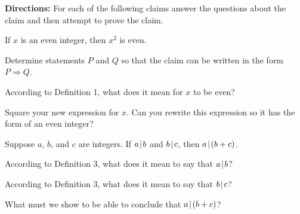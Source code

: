\newpage

\noindent \textbf{Directions:}  For each of the following claims answer the questions about the claim and then attempt to prove the claim.

\begin{claim}  If $x$ is an even integer, then $x^2$ is even.
\end{claim}
\begin{mdframed}[backgroundcolor=white]
	\begin{question}
	\item  Determine statements $P$ and $Q$ so that the claim can be written in the form $P \Rightarrow Q$.
	\vspace{1in}
	
	\item  According to Definition 1, what does it mean for $x$ to be even?
	
	\vspace{.75in}
	
	\item  Square your new expression for $x$.  Can you rewrite this expression so it has the form of an even integer?
	\end{question}
	
	\vspace{1in}

\end{mdframed}

\newpage

\begin{claim} Suppose $a$, $b$, and $c$ are integers.  If $a \! \mid \! b$ and $b \! \mid \! c$, then $a \! \mid \! (b+c)$.
\end{claim}
\begin{mdframed}
	\begin{question}[resume]
	\item According to Definition 3, what does it mean to say that $a \! \mid \! b$?
	\vspace{.75in}
	\item According to Definition 3, what does it mean to say that $b \! \mid \! c$?
	\vspace{.75in}
	\item What must we show to be able to conclude that $a \! \mid \! (b+c)$?
	\vspace{.75in}
	\end{question}

\end{mdframed}
\vspace{.75in}

